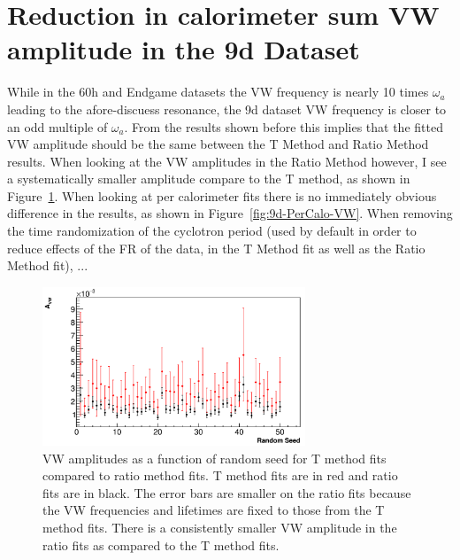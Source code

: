 \documentclass[12pt,letterpaper]{article}
\newcommand{\figref}[1]{Figure~\ref{#1}}
\def\wa{$\omega_{a}$\xspace}
\begin{document}
\clearpage


\section{Reduction in calorimeter sum VW amplitude in the 9d Dataset}



While in the 60h and Endgame datasets the VW frequency is nearly 10 times \wa leading to the afore-discuess resonance, the 9d dataset VW frequency is closer to an odd multiple of \wa. From the results shown before this implies that the fitted VW amplitude should be the same between the T Method and Ratio Method results. When looking at the VW amplitudes in the Ratio Method however, I see a systematically smaller amplitude compare to the T method, as shown in \figref{fig:vw-fixed-w-tau-9d-randseeds}. When looking at per calorimeter fits there is no immediately obvious difference in the results, as shown in \figref{fig:9d-PerCalo-VW}. When removing the time randomization of the cyclotron period (used by default in order to reduce effects of the FR of the data, in the T Method fit as well as the Ratio Method fit), ...



\begin{figure}[]
    \centering
    \includegraphics[width=0.7\textwidth]{vw-fixed-w-tau-9d-randseeds}
    \caption[]{VW amplitudes as a function of random seed for T method fits compared to ratio method fits. T method fits are in red and ratio fits are in black. The error bars are smaller on the ratio fits because the VW frequencies and lifetimes are fixed to those from the T method fits. There is a consistently smaller VW amplitude in the ratio fits as compared to the T method fits.}
    \label{fig:vw-fixed-w-tau-9d-randseeds}
\end{figure}
\end{document}
